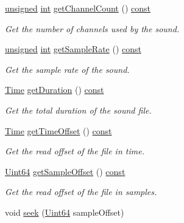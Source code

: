 \begin{DoxyCompactItemize}
\hyperlink{curses_8priv_8h_aca40206900cfc164654362fa8d4ad1e6}{unsigned} \hyperlink{term__entry_8h_ad65b480f8c8270356b45a9890f6499ae}{int} \hyperlink{classsf_1_1_input_sound_file_a3a3d113d0f093c806edeb47a0eb509bd}{get\-Channel\-Count} () \hyperlink{term__entry_8h_a57bd63ce7f9a353488880e3de6692d5a}{const} 
\begin{DoxyCompactList}\small\item\em Get the number of channels used by the sound. \end{DoxyCompactList}\item 
\hyperlink{curses_8priv_8h_aca40206900cfc164654362fa8d4ad1e6}{unsigned} \hyperlink{term__entry_8h_ad65b480f8c8270356b45a9890f6499ae}{int} \hyperlink{classsf_1_1_input_sound_file_adfbd1eaaf9fc0b469311fc159f5a3ecb}{get\-Sample\-Rate} () \hyperlink{term__entry_8h_a57bd63ce7f9a353488880e3de6692d5a}{const} 
\begin{DoxyCompactList}\small\item\em Get the sample rate of the sound. \end{DoxyCompactList}\item 
\hyperlink{classsf_1_1_time}{Time} \hyperlink{classsf_1_1_input_sound_file_a8c5707b202d8785f806bd6604a9e19c5}{get\-Duration} () \hyperlink{term__entry_8h_a57bd63ce7f9a353488880e3de6692d5a}{const} 
\begin{DoxyCompactList}\small\item\em Get the total duration of the sound file. \end{DoxyCompactList}\item 
\hyperlink{classsf_1_1_time}{Time} \hyperlink{classsf_1_1_input_sound_file_aa9ca3de078119245e2f0602031d7e2c3}{get\-Time\-Offset} () \hyperlink{term__entry_8h_a57bd63ce7f9a353488880e3de6692d5a}{const} 
\begin{DoxyCompactList}\small\item\em Get the read offset of the file in time. \end{DoxyCompactList}\item 
\hyperlink{namespacesf_add9ac83466d96b9f50a009b9f4064266}{Uint64} \hyperlink{classsf_1_1_input_sound_file_a94f112dc810dd5009dbe3ddb1ba9de2f}{get\-Sample\-Offset} () \hyperlink{term__entry_8h_a57bd63ce7f9a353488880e3de6692d5a}{const} 
\begin{DoxyCompactList}\small\item\em Get the read offset of the file in samples. \end{DoxyCompactList}\item 
void \hyperlink{classsf_1_1_input_sound_file_aaf97be15020a42e159ff88f76f22af20}{seek} (\hyperlink{namespacesf_add9ac83466d96b9f50a009b9f4064266}{Uint64} sample\-Offset)

\end{DoxyCompactItemize}
